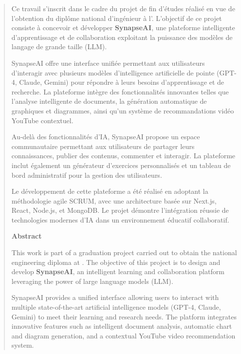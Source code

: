 
\begin{abstract}

Ce travail s'inscrit dans le cadre du projet de fin d'études réalisé en vue de l'obtention du diplôme national d'ingénieur à l'\ITBS. L'objectif de ce projet consiste à concevoir et développer \textbf{SynapseAI}, une plateforme intelligente d'apprentissage et de collaboration exploitant la puissance des modèles de langage de grande taille (LLM).

SynapseAI offre une interface unifiée permettant aux utilisateurs d'interagir avec plusieurs modèles d'intelligence artificielle de pointe (GPT-4, Claude, Gemini) pour répondre à leurs besoins d'apprentissage et de recherche. La plateforme intègre des fonctionnalités innovantes telles que l'analyse intelligente de documents, la génération automatique de graphiques et diagrammes, ainsi qu'un système de recommandations vidéo YouTube contextuel.

Au-delà des fonctionnalités d'IA, SynapseAI propose un espace communautaire permettant aux utilisateurs de partager leurs connaissances, publier des contenus, commenter et interagir. La plateforme inclut également un générateur d'exercices personnalisés et un tableau de bord administratif pour la gestion des utilisateurs.

Le développement de cette plateforme a été réalisé en adoptant la méthodologie agile SCRUM, avec une architecture basée sur Next.js, React, Node.js, et MongoDB. Le projet démontre l'intégration réussie de technologies modernes d'IA dans un environnement éducatif collaboratif.

\vspace{0.5cm}


\vspace{2cm}
\centerline{\bf Abstract}
\vspace{0.6cm}

This work is part of a graduation project carried out to obtain the national engineering diploma at \ITBS. The objective of this project is to design and develop \textbf{SynapseAI}, an intelligent learning and collaboration platform leveraging the power of large language models (LLM).

SynapseAI provides a unified interface allowing users to interact with multiple state-of-the-art artificial intelligence models (GPT-4, Claude, Gemini) to meet their learning and research needs. The platform integrates innovative features such as intelligent document analysis, automatic chart and diagram generation, and a contextual YouTube video recommendation system.


\end{abstract}
